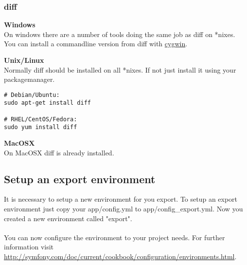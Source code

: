 \subsubsection{diff}

\noindent \textbf{Windows}\\
\noindent On windows there are a number of tools doing the same job as diff on *nixes. You can install a commandline version from diff with \mbox{\href{http://www.cygwin.com/}{cygwin}}.

\noindent \textbf{Unix/Linux}\\
\noindent Normally diff should be installed on all *nixes. If not just install it using your packagemanager. \\
\begin{verbatim}
# Debian/Ubuntu:
sudo apt-get install diff

# RHEL/CentOS/Fedora:
sudo yum install diff
\end{verbatim}

\noindent \textbf{MacOSX}\\
\noindent On MacOSX diff is already installed.



\subsection{Setup an export environment}

It is necessary to setup a new environment for you export. To setup an export environment just copy your app/config.yml to app/config\_export.yml. Now you created a new environment called "export". \\
\\
You can now configure the environment to your project needs. For further information visit \url{http://symfony.com/doc/current/cookbook/configuration/environments.html}.\\
